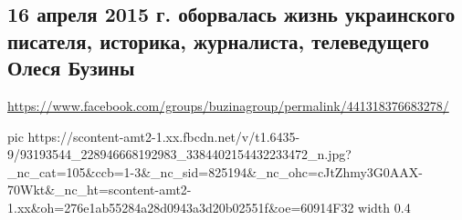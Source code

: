  
 
 
 
 
\subsection{16 апреля 2015 г. оборвалась жизнь украинского писателя, историка, журналиста, телеведущего Олеся Бузины}
\label{sec:apr_2020.fb.buzinagroup.1.buzina_oles_smert}
\url{https://www.facebook.com/groups/buzinagroup/permalink/441318376683278/}

\ifcmt
  pic https://scontent-amt2-1.xx.fbcdn.net/v/t1.6435-9/93193544_228946668192983_3384402154432233472_n.jpg?_nc_cat=105&ccb=1-3&_nc_sid=825194&_nc_ohc=cJtZhmy3G0AAX-70Wkt&_nc_ht=scontent-amt2-1.xx&oh=276e1ab55284a28d0943a3d20b02551f&oe=60914F32
  width 0.4
\fi

